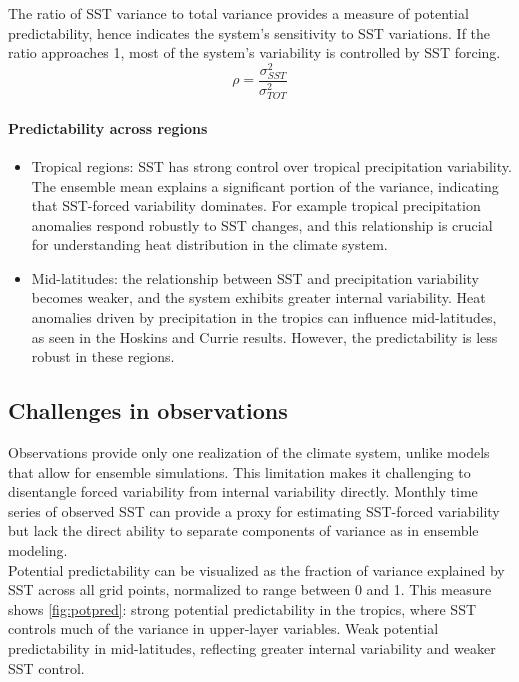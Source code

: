 The ratio of SST variance to total variance provides a measure of potential predictability, hence indicates the system's sensitivity to SST variations. If the ratio approaches 1, most of the system's variability is controlled by SST forcing.
\begin{equation}\label{eq.pot predictability}
    \rho=\frac{\sigma^2_{SST}}{\sigma^2_{TOT}}
\end{equation}
\paragraph{Predictability across regions}
\begin{itemize}
    \item Tropical regions: SST has strong control over tropical precipitation variability.
The ensemble mean explains a significant portion of the variance, indicating that SST-forced variability dominates. For example tropical precipitation anomalies respond robustly to SST changes, and this relationship is crucial for understanding heat distribution in the climate system.
\item Mid-latitudes: the relationship between SST and precipitation variability becomes weaker, and the system exhibits greater internal variability.
Heat anomalies driven by precipitation in the tropics can influence mid-latitudes, as seen in the Hoskins and Currie results. However, the predictability is less robust in these regions.
\end{itemize}
\subsection{Challenges in observations}
Observations provide only one realization of the climate system, unlike models that allow for ensemble simulations. This limitation makes it challenging to disentangle forced variability from internal variability directly. Monthly time series of observed SST can provide a proxy for estimating SST-forced variability but lack the direct ability to separate components of variance as in ensemble modeling.\\




Potential predictability can be visualized as the fraction of variance explained by SST across all grid points, normalized to range between 0 and 1. This measure shows \ref{fig:potpred}: strong potential predictability in the tropics, where SST controls much of the variance in upper-layer variables.
Weak potential predictability in mid-latitudes, reflecting greater internal variability and weaker SST control.

